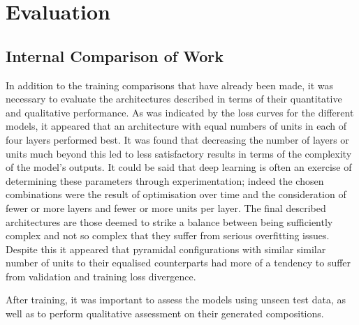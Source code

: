 \documentclass[12pt,]{article}
\begin{document}
\hypertarget{evaluation}{%
\section{Evaluation}\label{evaluation}}

\hypertarget{internal-comparison-of-work}{%
\subsection{Internal Comparison of
Work}\label{internal-comparison-of-work}}

In addition to the training comparisons that have already been made, it
was necessary to evaluate the architectures described in terms of their
quantitative and qualitative performance. As was indicated by the loss
curves for the different models, it appeared that an architecture with
equal numbers of units in each of four layers performed best. It was
found that decreasing the number of layers or units much beyond this led
to less satisfactory results in terms of the complexity of the model's
outputs. It could be said that deep learning is often an exercise of
determining these parameters through experimentation; indeed the chosen
combinations were the result of optimisation over time and the
consideration of fewer or more layers and fewer or more units per layer.
The final described architectures are those deemed to strike a balance
between being sufficiently complex and not so complex that they suffer
from serious overfitting issues. Despite this it appeared that pyramidal
configurations with similar similar number of units to their equalised
counterparts had more of a tendency to suffer from validation and
training loss divergence.

After training, it was important to assess the models using unseen test
data, as well as to perform qualitative assessment on their generated
compositions.
\end{document}
